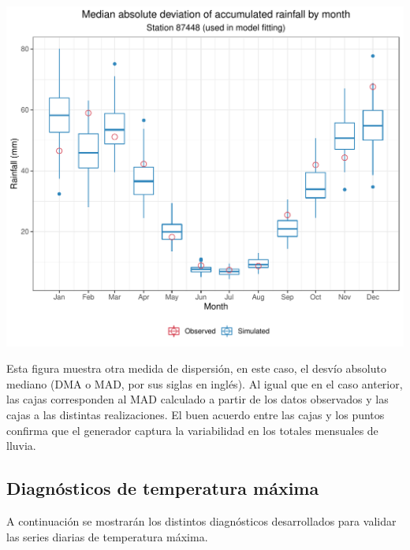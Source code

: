 \documentclass[
]{article}
\begin{document}
\begin{center}\includegraphics{Webinario_Generador_files/figure-latex/unnamed-chunk-39-1} \end{center}

Esta figura muestra otra medida de dispersión, en este caso, el desvío absoluto mediano (DMA o MAD, por sus siglas en inglés). Al igual que en el caso anterior, las cajas corresponden al MAD calculado a partir de los datos observados y las cajas a las distintas realizaciones. El buen acuerdo entre las cajas y los puntos confirma que el generador captura la variabilidad en los totales mensuales de lluvia.

\hypertarget{diagnuxf3sticos-de-temperatura-muxe1xima}{%
\subsection{Diagnósticos de temperatura máxima}\label{diagnuxf3sticos-de-temperatura-muxe1xima}}

A continuación se mostrarán los distintos diagnósticos desarrollados para validar las series diarias de temperatura máxima.
\end{document}
